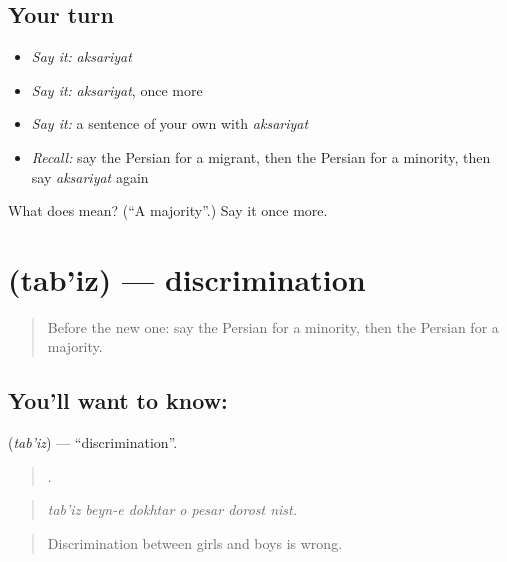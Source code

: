 \subsection*{Your turn}
\begin{itemize}
\raggedright
  \item \emph{Say it:} \emph{aksariyat}
  \item \emph{Say it:} \emph{aksariyat}, once more
  \item \emph{Say it:} a sentence of your own with \emph{aksariyat}
  \item \emph{Recall:} say the Persian for a migrant, then the Persian for a minority, then say \emph{aksariyat} again
\end{itemize}

\begin{tcolorbox}[breakable,colback=teal!4,colframe=teal!35!black,title={Before you move on}]
What does  mean? (\textquotedblleft{}A majority\textquotedblright{}.) Say it once more.
\end{tcolorbox}
\section[\texorpdfstring{\fa{تبعیض} (tab'iz)}{تبعیض (tab'iz)}]{ (tab'iz) — discrimination}

\label{lesson:FA-C387-tabiz}



\begin{quote}
Before the new one: say the Persian for a minority, then the Persian for a majority.
\end{quote}

\subsection*{You'll want to know: }
\textbf{} (\emph{tab'iz}) — \textquotedblleft{}discrimination\textquotedblright{}.

\begin{quote}
      .
\end{quote}

\begin{quote}
\emph{tab'iz beyn-e dokhtar o pesar dorost nist.}
\end{quote}

\begin{quote}
Discrimination between girls and boys is wrong.
\end{quote}

